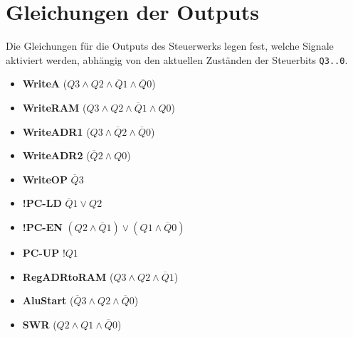 \section{Gleichungen der Outputs}
Die Gleichungen für die Outputs des Steuerwerks legen fest, welche Signale aktiviert werden,
abhängig von den aktuellen Zuständen der Steuerbits \texttt{Q3..0}.
\begin{itemize}
    \item \textbf{WriteA}
          ($Q3 \land Q2 \land \overline Q1 \land \overline Q0$)

    \item \textbf{WriteRAM}
          ($Q3 \land Q2 \land \overline Q1 \land Q0$)

    \item \textbf{WriteADR1}
          ($Q3 \land \overline Q2 \land \overline Q0$)

    \item \textbf{WriteADR2}
          ($\overline Q2 \land Q0$)

    \item \textbf{WriteOP}
          $\overline Q3$

    \item \textbf{!PC-LD}
          $\overline Q1 \lor Q2$

    \item \textbf{!PC-EN}
          $(Q2 \land \overline Q1) \lor
              (Q1 \land \overline Q0)$

    \item \textbf{PC-UP}
          $!Q1$

    \item \textbf{RegADRtoRAM}
          ($Q3 \land Q2 \land \overline Q1$)

    \item \textbf{AluStart}
          ($\overline Q3 \land Q2 \land \overline Q0$)

    \item \textbf{SWR}
          ($Q2 \land Q1 \land \overline Q0$)
\end{itemize}




